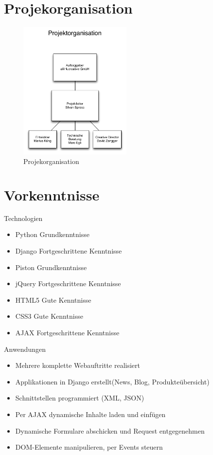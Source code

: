 \section{Projekorganisation}

\begin{figure}[!ht]
\begin{center}
\includegraphics[width=0.5\textwidth,angle=0]{./bilder/01_projektorganisation.pdf}
\caption[Projekorganisation]{Projekorganisation\footnotemark}
\label{pic:01_projektorganisation}
\end{center}
\end{figure}

\section{Vorkenntnisse}

Technologien
\begin{itemize}
    \item Python Grundkenntnisse
    \item Django Fortgeschrittene Kenntnisse
    \item Piston Grundkenntnisse
    \item jQuery Fortgeschrittene Kenntnisse
    \item HTML5 Gute Kenntnisse
    \item CSS3 Gute Kenntnisse
    \item AJAX Fortgeschrittene Kenntnisse
\end{itemize}

Anwendungen
\begin{itemize}
    \item Mehrere komplette Webauftritte realisiert
    \item Applikationen in Django erstellt(News, Blog, Produkteübersicht)
    \item Schnittstellen programmiert (XML, JSON)
    \item Per AJAX dynamische Inhalte laden und einfügen
    \item Dynamische Formulare abschicken und Request entgegenehmen
    \item DOM-Elemente manipulieren, per Events steuern
\end{itemize}
    
